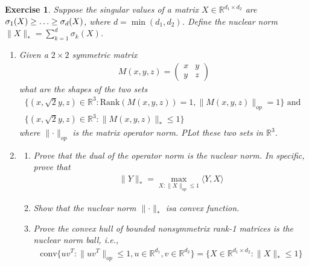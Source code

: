 \documentclass[12pt]{article}
\theoremstyle{colon}
\newtheorem{exercise}{Exercise}
\begin{document}
\clearpage

\begin{exercise}
  Suppose the singular values of a matrix $X \in \mathbb{R}^{d_1 \times d_2}$ are $\sigma_1(X) \geq \mathellipsis \geq \sigma_d(X)$, where $d = \min (d_1, d_2)$. Define the nuclear norm $\lVert X \rVert_* = \sum_{k=1}^d \sigma_k(X)$.

  \begin{enumerate}[label=\arabic*)]
    \item Given a $2 \times 2$ symmetric matrix
      \begin{gather*}
        M(x,y,z) = \begin{pmatrix} x & y \\ y & z \end{pmatrix}
      \end{gather*}
      what are the shapes of the two sets
      \begin{gather*}
        \{ (x, \sqrt{2}y, z) \in \mathbb{R}^3 : \text{Rank}(M(x,y,z)) = 1, \lVert M(x,y,z) \rVert_{op} = 1 \} \text{ and } \\
        \{ (x, \sqrt{2}y, z) \in \mathbb{R}^3 : \lVert M(x,y,z) \rVert_* \leq 1 \}
      \end{gather*}
      where $\lVert \cdot \rVert_{op}$ is the matrix operator norm. PLot these two sets in $\mathbb{R}^3$.

    \item
      \begin{enumerate}[label=\alph*)]
        \item Prove that the dual of the operator norm is the nuclear norm. In specific, prove that
          \begin{gather*}
            \lVert Y \rVert_* = \max_{X : \lVert X \rVert_{op} \leq 1} \langle Y, X \rangle
          \end{gather*}

        \item Show that the nuclear norm $\lVert \cdot \rVert_*$ isa convex function.

        \item Prove the convex hull of bounded nonsymmetrix rank-1 matrices is the nuclear norm ball, i.e.,
          \begin{gather*}
            \text{conv}\{ u v^T : \lVert u v^T \rVert_{op} \leq 1, u \in \mathbb{R}^{d_1}, v \in \mathbb{R}^{d_2} \} = \{ X \in \mathbb{R}^{d_1 \times d_2}  : \lVert X \rVert_* \leq 1 \}
          \end{gather*}
      \end{enumerate}


\end{enumerate}
\end{exercise}
\end{document}
